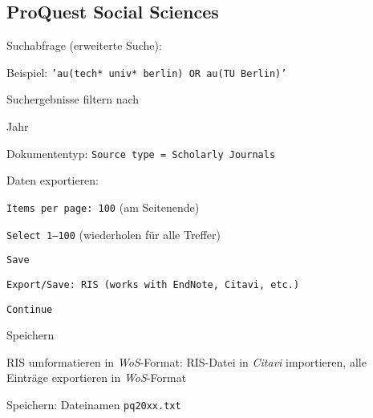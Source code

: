 \subsection*{ProQuest Social Sciences}
\begin{compactitem}
\item Suchabfrage (erweiterte Suche):
	\begin{compactitem}
    \item Beispiel: \texttt{'au(tech* univ* berlin) OR au(TU Berlin)'}
    \end{compactitem}
\item Suchergebnisse filtern nach
	\begin{compactitem}
    \item Jahr
    \item Dokumententyp: \texttt{Source type = Scholarly Journals}
    \end{compactitem}
\item Daten exportieren: 
	\begin{compactitem}
    \item \texttt{Items per page: 100} (am Seitenende)
    \item \texttt{Select 1--100} (wiederholen für alle Treffer)
    \item \texttt{Save}
    \item \texttt{Export/Save: RIS (works with EndNote, Citavi, etc.)}
    \item \texttt{Continue}
    \item Speichern
	\end{compactitem}
\item RIS umformatieren in \textit{WoS}-Format: RIS-Datei in \textit{Citavi} importieren, alle Einträge exportieren in \textit{WoS}-Format
\item Speichern: Dateinamen \texttt{pq20xx.txt}
\end{compactitem}

